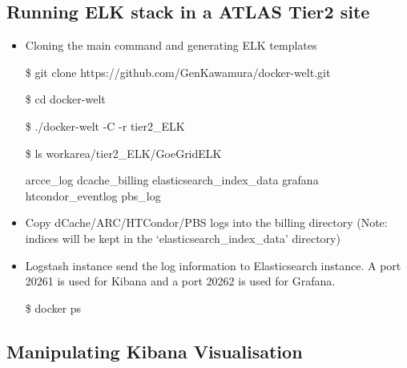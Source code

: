 \documentclass[]{article}
\begin{document}
\subsection{Running ELK stack in a ATLAS Tier2
site}\label{running-elk-stack-in-a-atlas-tier2-site}

\begin{itemize}
\item
  Cloning the main command and generating ELK templates

  \$ git clone https://github.com/GenKawamura/docker-welt.git

  \$ cd docker-welt

  \$ ./docker-welt -C -r tier2\_ELK

  \$ ls workarea/tier2\_ELK/GoeGridELK

  arcce\_log dcache\_billing elasticsearch\_index\_data grafana
  htcondor\_eventlog pbs\_log
\item
  Copy dCache/ARC/HTCondor/PBS logs into the billing directory (Note:
  indices will be kept in the `elasticsearch\_index\_data' directory)
\item
  Logstash instance send the log information to Elasticsearch instance.
  A port 20261 is used for Kibana and a port 20262 is used for Grafana.

  \$ docker ps
\end{itemize}

\subsection{Manipulating Kibana
Visualisation}\label{manipulating-kibana-visualisation}
\end{document}
